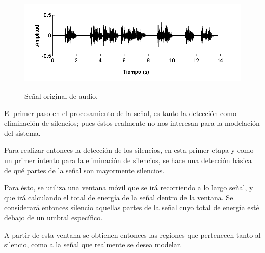 \begin{figure}[ht]
  {\includegraphics[width=0.9\linewidth]{gfx/chap2/signal-orig}} \quad
  \caption{Señal original de audio.}
  \label{fig:sign_orig}
\end{figure}

El primer paso en el procesamiento de la señal, es tanto la detección como eliminación de silencios; pues éstos realmente no nos interesan para la modelación del sistema.


Para realizar entonces la detección de los silencios, en esta primer etapa y como un primer intento para la eliminación de silencios, se hace una detección básica de qué partes de la señal son mayormente silencios.

Para ésto, se utiliza una ventana móvil que se irá recorriendo a lo largo señal, y que irá calculando el total de energía de la señal dentro de la ventana. Se considerará entonces silencio aquellas partes de la señal cuyo total de energía esté debajo de un umbral específico.

A partir de esta ventana se obtienen entonces las regiones que pertenecen tanto al silencio, como a la señal que realmente se desea modelar.
  
